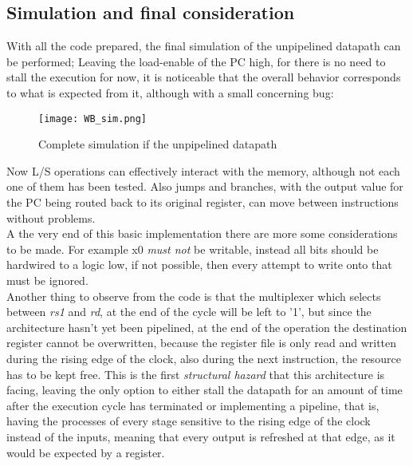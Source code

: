 \subsection{Simulation and final consideration}
With all the code prepared, the final simulation of the unpipelined datapath can be performed; Leaving the load-enable of the PC high, for there is no need to stall the execution for now, it is noticeable that the overall behavior corresponds to what is expected from it, although with a small concerning bug:

\begin{figure}[!ht]
    \centering
    \texttt{[image: WB\_sim.png]}
    \caption{Complete simulation if the unpipelined datapath}
    \label{fig:WB_sim}
\end{figure}

Now L/S operations can effectively interact with the memory, although not each one of them has been tested. Also jumps and branches, with the output value for the PC being routed back to its original register, can move between instructions without problems.\\
A the very end of this basic implementation there are more some considerations to be made. For example x0 \emph{must not} be writable, instead all bits should be hardwired to a logic low, if not possible, then every attempt to write onto that must be ignored.\\
Another thing to observe from the code is that the multiplexer which selects between \emph{rs1} and \emph{rd}, at the end of the cycle will be left to '1', but since the architecture hasn't yet been pipelined, at the end of the operation the destination register cannot be overwritten, because the register file is only read and written during the rising edge of the clock, also during the next instruction, the resource has to be kept free. This is the first \emph{structural hazard} that this architecture is facing, leaving the only option to either stall the datapath for an amount of time after the execution cycle has terminated or implementing a pipeline, that is, having the processes of every stage sensitive to the rising edge of the clock instead of the inputs, meaning that every output is refreshed at that edge, as it would be expected by a register.